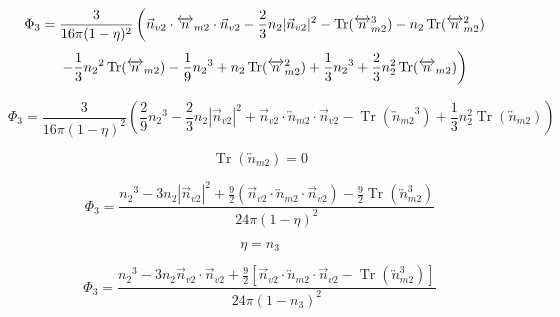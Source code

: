 \documentclass[double,12pt]{beavtex}
\begin{document}
\begin{displaymath}{\Phi_3=\frac{3}{16\pi(1-\eta)^2}\left(\vec{n}_{v2}\cdot{\overleftrightarrow{n}_{m2}}\cdot{\vec{n}_{v2}}-\frac{2}{3}n_2|\vec{n}_{v2}|^2-\operatorname{Tr}({\overleftrightarrow{n}_{m2}^3})
-n_2\operatorname{Tr}(\overleftrightarrow{n}_{m2}^2)\color{white}\right)\color{black}}\end{displaymath} 
\begin{equation}{\color{white}\left(\color{black}-\frac{1}{3}{n_2}^2\operatorname{Tr}(\overleftrightarrow{n}_{m2})-\frac{1}{9}{n_2}^3+n_2\operatorname{Tr}(\overleftrightarrow{n}_{m2}^2)+\frac{1}{3}{n_2}^3+\frac{2}{3}n^2_2\operatorname{Tr}(\overleftrightarrow{n}_{m2})\right)}\end{equation} 

\begin{equation}{\Phi_3=\frac{3}{16\pi(1-\eta)^2}\left(\frac{2}{9}{n_2}^3-\frac{2}{3}n_2|\vec{n}_{v2}|^2+\vec{n}_{v2}\cdot{\overleftrightarrow{n}_{m2}}\cdot{\vec{n}_{v2}}-\operatorname{Tr}({\overleftrightarrow{n}_{m2}}^3)+\frac{1}{3}n^2_2\operatorname{Tr}(\overleftrightarrow{n}_{m2})\right)}\end{equation} 

\begin{equation}{\operatorname{Tr}(\overleftrightarrow{n}_{m2})=0}\end{equation} 

\begin{equation}{\Phi_3=\frac{{n_2}^3-3n_2|\vec{n}_{v2}|^2+\frac{9}{2}(\vec{n}_{v2}\cdot{\overleftrightarrow{n}_{m2}}\cdot{\vec{n}_{v2}})-\frac{9}{2}\operatorname{Tr}({\overleftrightarrow{n}^3_{m2}})}{24\pi(1-\eta)^2}}\end{equation} 

\begin{equation}{\eta=n_3}\end{equation} 

\begin{equation}{\Phi_3=\frac{{n_2}^3-3n_2\vec{n}_{v2}\cdot\vec{n}_{v2}+\frac{9}{2}[\vec{n}_{v2}\cdot{\overleftrightarrow{n}_{m2}}\cdot{\vec{n}_{v2}}-\operatorname{Tr}({\overleftrightarrow{n}^3_{m2}})]}{24\pi(1-n_3)^2}}\end{equation} 
\end{document}
